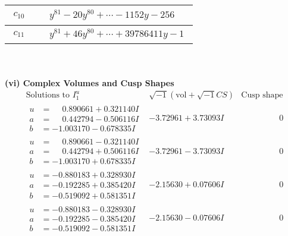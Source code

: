 \documentclass[1p]{elsarticle_modified}
\theoremstyle{definition}
\newcommand{\I}{\sqrt{-1}}
\begin{document}
\begin{tabular}{m{50pt}|m{274pt}}
\hline $$\begin{aligned}c_{10}\end{aligned}$$&$\begin{aligned}
&y^{81}-20 y^{80}+\cdots-1152 y-256
\end{aligned}$\\
\hline $$\begin{aligned}c_{11}\end{aligned}$$&$\begin{aligned}
&y^{81}+46 y^{80}+\cdots+39786411 y-1
\end{aligned}$\\
\hline
\end{tabular}\\~\\
\newpage\flushleft \textbf{(vi) Complex Volumes and Cusp Shapes}
$$\begin{array}{c|c|c}  
\text{Solutions to }I^u_{1}& \I (\text{vol} + \sqrt{-1}CS) & \text{Cusp shape}\\
 \hline 
\begin{aligned}
u &= \phantom{-}0.890661 + 0.321140 I \\
a &= \phantom{-}0.442794 - 0.506116 I \\
b &= -1.003170 - 0.678335 I\end{aligned}
 & -3.72961 + 3.73093 I & \phantom{-0.000000 } 0 \\ \hline\begin{aligned}
u &= \phantom{-}0.890661 - 0.321140 I \\
a &= \phantom{-}0.442794 + 0.506116 I \\
b &= -1.003170 + 0.678335 I\end{aligned}
 & -3.72961 - 3.73093 I & \phantom{-0.000000 } 0 \\ \hline\begin{aligned}
u &= -0.880183 + 0.328930 I \\
a &= -0.192285 + 0.385420 I \\
b &= -0.519092 + 0.581351 I\end{aligned}
 & -2.15630 + 0.07606 I & \phantom{-0.000000 } 0 \\ \hline\begin{aligned}
u &= -0.880183 - 0.328930 I \\
a &= -0.192285 - 0.385420 I \\
b &= -0.519092 - 0.581351 I\end{aligned}
 & -2.15630 - 0.07606 I & \phantom{-0.000000 } 0 \\ \hline\begin{aligned}

\end{aligned}
\end{array}$$
\end{document}

